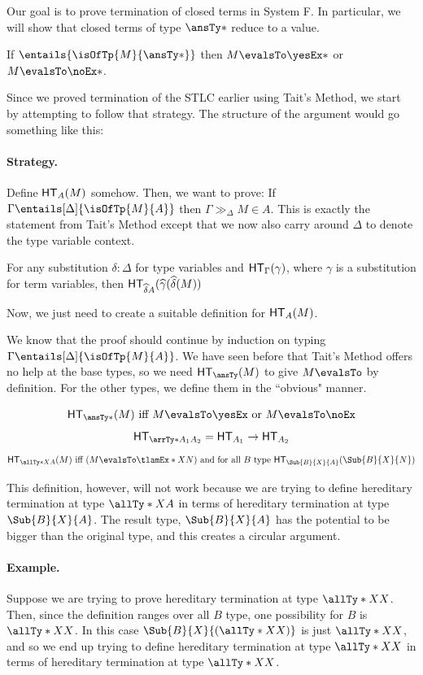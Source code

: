 \documentclass[letterpaper]{article}
\begin{document}
Our goal is to prove termination of closed terms in System F. In particular, we will show that closed terms of type $\ansTy*$ reduce to a value.
\begin{theorem}
If $\entails{\isOfTp{M}{\ansTy*}}$ then $M \evalsTo \yesEx*$ or $M \evalsTo \noEx*$.
\end{theorem}

Since we proved termination of the STLC earlier using Tait's Method, we start by attempting to follow that strategy. The structure of the argument would go something like this:
\paragraph{Strategy.} Define $\HT[A](M)$ somehow. Then, we want to prove: If $\Gamma \entails[\Delta]{\isOfTp{M}{A}}$ then $\Gamma \gg_{\Delta} M \in A$. This is exactly the statement from Tait's Method except that we now also carry around $\Delta$ to denote the type variable context.

\begin{definition}
For any substitution $\delta : \Delta$ for type variables and $\HT[\Gamma](\gamma)$, where $\gamma$ is a substitution for term variables, then $\HT[\widehat{\delta}A](\widehat{\gamma}(\widehat{\delta}(M))$
\end{definition}

Now, we just need to create a suitable definition for $\HT[A](M)$.

We know that the proof should continue by induction on typing $\Gamma \entails[\Delta]{\isOfTp{M}{A}}$. We have seen before that Tait's Method offers no help at the base types, so we need $\HT[\ansTy](M)$ to give $M \evalsTo$ by definition. For the other types, we define them in the ``obvious" manner.

$$
\HT[\ansTy*](M) \text{ iff } M \evalsTo \yesEx \text{ or } M \evalsTo \noEx
$$
$$
\HT[\arrTy*{A_1}{A_2}] = \HT[A_1] \rightarrow \HT[A_2]
$$
$$
\HT[\allTy*{X}{A}](M) \text{ iff } (M \evalsTo \tlamEx*{X}{N}) \text{ and for all } B \text{ type } \HT[\Sub{B}{X}{A}](\Sub{B}{X}{N})
$$

This definition, however, will not work because we are trying to define hereditary termination at type $\allTy*{X}{A}$ in terms of hereditary termination at type $\Sub{B}{X}{A}$. The result type, $\Sub{B}{X}{A}$ has the potential to be bigger than the original type, and this creates a circular argument.

\paragraph{Example.} Suppose we are trying to prove hereditary termination at type $\allTy*{X}{X}$. Then, since the definition ranges over all $B$ type, one possibility for $B$ is $\allTy*{X}{X}$. In this case $\Sub{B}{X}{(\allTy*{X}{X})}$ is just $\allTy*{X}{X}$, and so we end up trying to define hereditary termination at type $\allTy*{X}{X}$ in terms of hereditary termination at type $\allTy*{X}{X}$.
\end{document}
